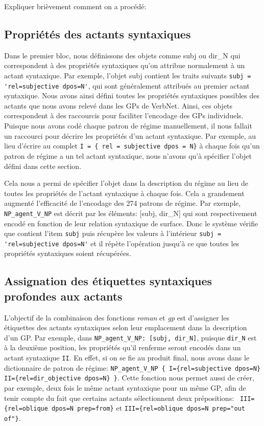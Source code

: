 Expliquer brièvement comment on a procédé:

\subsection{Propriétés des actants syntaxiques}

Dans le premier bloc, nous définissons des objets comme subj ou dir\_N qui correspondent à des propriétés syntaxiques qu'on attribue normalement à un actant syntaxique. Par exemple, l'objet subj contient les traits suivants \lstinline|subj = 'rel=subjective dpos=N'|, qui sont généralement attribués au premier actant syntaxique. Nous avons ainsi défini toutes les propriétés syntaxiques possibles des actants que nous avons relevé dans les \acp{GP} de VerbNet. Ainsi, ces objets correspondent à des raccourcis pour faciliter l'encodage des \acp{GP} individuels. Puisque nous avons codé chaque patron de régime manuellement, il nous fallait un raccourci pour décrire les propriétés d'un actant syntaxique. Par exemple, au lieu d'écrire au complet \lstinline|I = { rel = subjective dpos = N}| à chaque fois qu'un patron de régime a un tel actant syntaxique, nous n'avons qu'à spécifier l'objet défini dans cette section. 

Cela nous a permi de spécifier l'objet dans la description du régime au lieu de toutes les propriétés de l'actant syntaxique à chaque fois. Cela a grandement augmenté l'efficacité de l'encodage des 274 patrons de régime. Par exemple, \lstinline|NP_agent_V_NP| est décrit par les éléments: [subj, dir\_N] qui sont respectivement encodé en fonction de leur relation syntaxique de surface. Donc le système vérifie que contient l'item \texttt{subj} puis récupère les valeurs à l'intérieur \lstinline|subj = 'rel=subjective dpos=N'| et il répète l'opération jusqu'à ce que toutes les propriétés syntaxiques soient récupérées.

\subsection{Assignation des étiquettes syntaxiques profondes aux actants}

L'objectif de la combinaison des fonctions \emph{roman} et \emph{gp} est d'assigner les étiquettes des actants syntaxiques selon leur emplacement dans la description d'un \ac{GP}. Par exemple, dans \lstinline|NP_agent_V_NP: [subj, dir_N]|, puisque \texttt{dir\_N} est à la deuxième position, les propriétés qu'il renferme seront encodés dans un actant syntaxique \texttt{II}. En effet, si on se fie au produit final, nous avons dans le dictionnaire de patron de régime: \lstinline|NP_agent_V_NP { I={rel=subjective dpos=N} II={rel=dir_objective dpos=N} }|.  Cette fonction nous permet aussi de créer, par exemple, deux fois le même actant syntaxique pour un même \ac{GP}, afin de tenir compte du fait que certains actants sélectionnent deux prépositions: \lstinline| III={rel=oblique dpos=N prep=from}| et \lstinline|III={rel=oblique dpos=N prep="out of"}|. 

